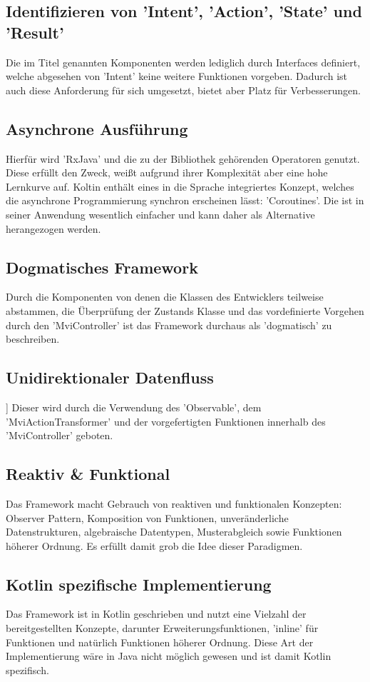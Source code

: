 \subsection{Identifizieren von 'Intent', 'Action', 'State' und 'Result'}
Die im Titel genannten Komponenten werden lediglich durch Interfaces definiert, welche abgesehen von 'Intent' keine weitere Funktionen vorgeben. Dadurch ist auch diese Anforderung für sich umgesetzt, bietet aber Platz für Verbesserungen.

\subsection{Asynchrone Ausführung}
Hierfür wird 'RxJava' und die zu der Bibliothek gehörenden Operatoren genutzt. Diese erfüllt den Zweck, weißt aufgrund ihrer Komplexität aber eine hohe Lernkurve auf. Koltin enthält eines in die Sprache integriertes Konzept, welches die asynchrone Programmierung synchron erscheinen lässt: 'Coroutines'.
\cite{kotlinCoroutines}
Die ist in seiner Anwendung wesentlich einfacher und kann daher als Alternative herangezogen werden.

\subsection{Dogmatisches Framework}
Durch die Komponenten von denen die Klassen des Entwicklers teilweise abstammen, die Überprüfung der Zustands Klasse und das vordefinierte Vorgehen durch den 'MviController' ist das Framework durchaus als 'dogmatisch' zu beschreiben.

\subsection{Unidirektionaler Datenfluss}]
Dieser wird durch die Verwendung des 'Observable', dem 'MviActionTransformer' und der vorgefertigten Funktionen innerhalb des  'MviController' geboten.

\subsection{Reaktiv \& Funktional}
Das Framework macht Gebrauch von reaktiven und funktionalen Konzepten: Observer Pattern, Komposition von Funktionen, unveränderliche Datenstrukturen, algebraische Datentypen, Musterabgleich sowie Funktionen höherer Ordnung. Es erfüllt damit grob die Idee dieser Paradigmen.

\subsection{Kotlin spezifische Implementierung}
Das Framework ist in Kotlin geschrieben und nutzt eine Vielzahl der bereitgestellten Konzepte, darunter Erweiterungsfunktionen, 'inline' für Funktionen und natürlich Funktionen höherer Ordnung. Diese Art der Implementierung wäre in Java nicht möglich gewesen und ist damit Kotlin spezifisch.
